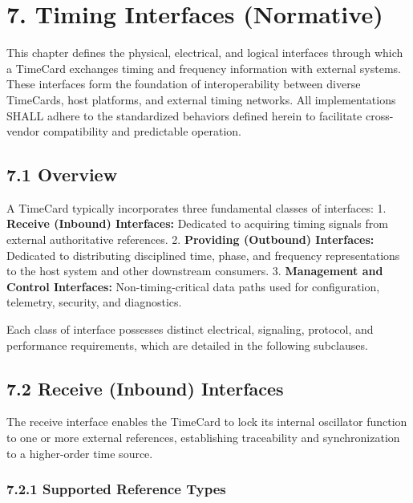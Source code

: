 \documentclass[
]{article}
\begin{document}
\section{7. Timing Interfaces
(Normative)}\label{timing-interfaces-normative}

This chapter defines the physical, electrical, and logical interfaces
through which a TimeCard exchanges timing and frequency information with
external systems. These interfaces form the foundation of
interoperability between diverse TimeCards, host platforms, and external
timing networks. All implementations SHALL adhere to the standardized
behaviors defined herein to facilitate cross-vendor compatibility and
predictable operation.

\subsection{7.1 Overview}\label{overview-1}

A TimeCard typically incorporates three fundamental classes of
interfaces: 1. \textbf{Receive (Inbound) Interfaces:} Dedicated to
acquiring timing signals from external authoritative references. 2.
\textbf{Providing (Outbound) Interfaces:} Dedicated to distributing
disciplined time, phase, and frequency representations to the host
system and other downstream consumers. 3. \textbf{Management and Control
Interfaces:} Non-timing-critical data paths used for configuration,
telemetry, security, and diagnostics.

Each class of interface possesses distinct electrical, signaling,
protocol, and performance requirements, which are detailed in the
following subclauses.

\subsection{7.2 Receive (Inbound)
Interfaces}\label{receive-inbound-interfaces}

The receive interface enables the TimeCard to lock its internal
oscillator function to one or more external references, establishing
traceability and synchronization to a higher-order time source.

\subsubsection{7.2.1 Supported Reference
Types}\label{supported-reference-types}
\end{document}
